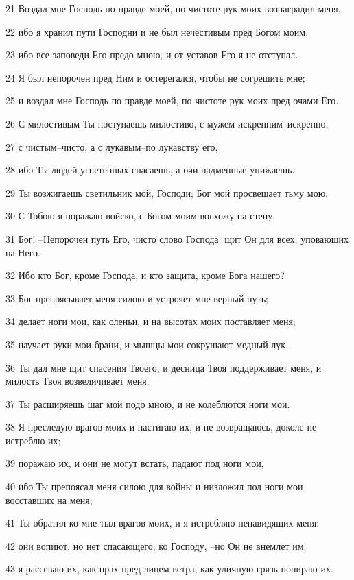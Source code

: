 \par 21 Воздал мне Господь по правде моей, по чистоте рук моих вознаградил меня,
\par 22 ибо я хранил пути Господни и не был нечестивым пред Богом моим;
\par 23 ибо все заповеди Его предо мною, и от уставов Его я не отступал.
\par 24 Я был непорочен пред Ним и остерегался, чтобы не согрешить мне;
\par 25 и воздал мне Господь по правде моей, по чистоте рук моих пред очами Его.
\par 26 С милостивым Ты поступаешь милостиво, с мужем искренним--искренно,
\par 27 с чистым--чисто, а с лукавым--по лукавству его,
\par 28 ибо Ты людей угнетенных спасаешь, а очи надменные унижаешь.
\par 29 Ты возжигаешь светильник мой, Господи; Бог мой просвещает тьму мою.
\par 30 С Тобою я поражаю войско, с Богом моим восхожу на стену.
\par 31 Бог! --Непорочен путь Его, чисто слово Господа; щит Он для всех, уповающих на Него.
\par 32 Ибо кто Бог, кроме Господа, и кто защита, кроме Бога нашего?
\par 33 Бог препоясывает меня силою и устрояет мне верный путь;
\par 34 делает ноги мои, как оленьи, и на высотах моих поставляет меня;
\par 35 научает руки мои брани, и мышцы мои сокрушают медный лук.
\par 36 Ты дал мне щит спасения Твоего, и десница Твоя поддерживает меня, и милость Твоя возвеличивает меня.
\par 37 Ты расширяешь шаг мой подо мною, и не колеблются ноги мои.
\par 38 Я преследую врагов моих и настигаю их, и не возвращаюсь, доколе не истреблю их;
\par 39 поражаю их, и они не могут встать, падают под ноги мои,
\par 40 ибо Ты препоясал меня силою для войны и низложил под ноги мои восставших на меня;
\par 41 Ты обратил ко мне тыл врагов моих, и я истребляю ненавидящих меня:
\par 42 они вопиют, но нет спасающего; ко Господу, --но Он не внемлет им;
\par 43 я рассеваю их, как прах пред лицем ветра, как уличную грязь попираю их.

